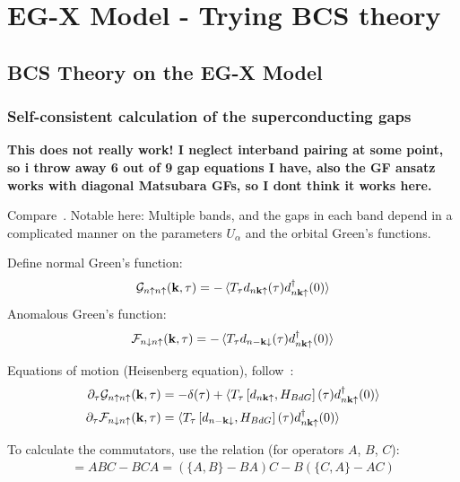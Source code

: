 \documentclass[../main.tex]{subfiles}
\begin{document}
\chapter{EG-X Model - Trying BCS theory}

\section{BCS Theory on the EG-X Model}\label{sec:bcs-theory-on-the-eg-x-model}

\subsection{Self-consistent calculation of the superconducting gaps}

\textbf{This does not really work! I neglect interband pairing at some point, so i throw away 6 out of 9 gap equations I have, also the GF ansatz works with diagonal Matsubara GFs, so I dont think it works here.}

Compare~\cite[ch. 10]{bruusManyBodyQuantumTheory2004}.
Notable here: Multiple bands, and the gaps in each band depend in a complicated manner on the parameters \(U_{\alpha}\) and the orbital Green's functions.

Define normal Green's function:
\begin{equation}
    \mathcal{G}_{n\uparrow n\uparrow} (\bm{\mathrm{k}}, \tau) = -\braket{T_{\tau} d_{n \bm{\mathrm{k}} \uparrow} (\tau) d_{n \bm{\mathrm{k}} \uparrow}^{\dagger} (0)}
\end{equation}
Anomalous Green's function:
\begin{equation}
    \mathcal{F}_{n\downarrow n\uparrow} (\bm{\mathrm{k}}, \tau) = -\braket{T_{\tau} d_{n -\bm{\mathrm{k}} \downarrow} (\tau) d_{n \bm{\mathrm{k}} \uparrow}^{\dagger} (0)}
\end{equation}

Equations of motion (Heisenberg equation), follow~\cite[ch. 17]{bruusManyBodyQuantumTheory2004}:
\begin{align}
    \pdif{\tau} \mathcal{G}_{n\uparrow n\uparrow} (\vb{k}, \tau) &= -\delta (\tau) + \braket{T_{\tau} \left[d_{n \vb{k} \uparrow}, H_{BdG}\right] (\tau) d_{n \vb{k} \uparrow}^{\dagger} (0)} \\
    \pdif{\tau} \mathcal{F}_{n\downarrow n\uparrow} (\vb{k}, \tau) &= \braket{T_{\tau} \left[d_{n -\vb{k} \downarrow}, H_{BdG}\right] (\tau) d_{n \vb{k} \uparrow}^{\dagger} (0)}
\end{align}

To calculate the commutators, use the relation (for operators \(A\), \(B\), \(C\)):
\begin{align}
    [A, BC] = ABC - BCA = (\{A, B\} - BA) C - B(\{C, A\} - AC)
\end{align}
\end{document}
